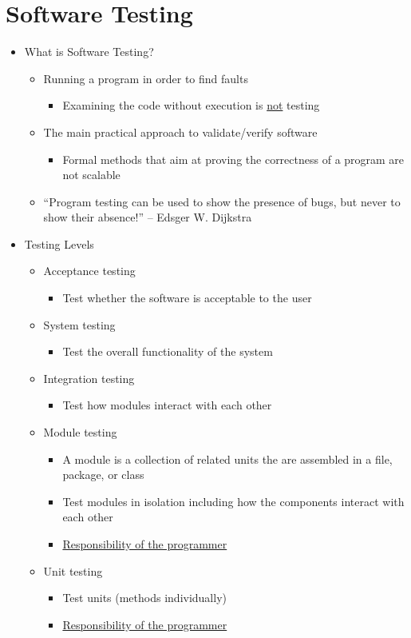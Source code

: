 \section{Software Testing}
\begin{itemize}
	\item What is Software Testing?
	\begin{itemize}
		\item Running a program in order to find faults
		\begin{itemize}
			\item Examining the code without execution is \underline{not} testing
		\end{itemize}
		\item The main practical approach to validate/verify software
		\begin{itemize}
			\item Formal methods that aim at proving the correctness of a program are not
			scalable
		\end{itemize}
		\item “Program testing can be used to show the presence of bugs, but never to show their absence!” -- Edsger W. Dijkstra
	\end{itemize}
	\item Testing Levels
	\begin{itemize}
		\item Acceptance testing
		\begin{itemize}
			\item Test whether the software is acceptable to the user
		\end{itemize}
		\item System testing
		\begin{itemize}
			\item Test the overall functionality of the system
		\end{itemize}
		\item Integration testing
		\begin{itemize}
			\item Test how modules interact with each other
		\end{itemize}
		\item Module testing
		\begin{itemize}
			\item A module is a collection of related units the are assembled in a file, package, or class
			\item Test modules in isolation including how the components interact with each other
			\item \underline{Responsibility of the programmer}
		\end{itemize}
		\item Unit testing
		\begin{itemize}
			\item Test units (methods individually)
			\item \underline{Responsibility of the programmer}
		\end{itemize}
	\end{itemize}


\end{itemize}
